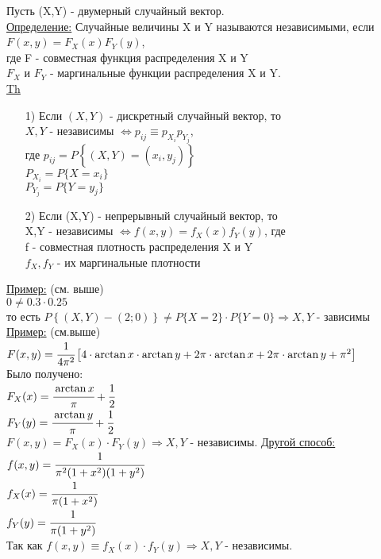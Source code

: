 

Пусть (X,Y) - двумерный случайный вектор.\\
\underline{Определение:} Случайные величины X и Y называются независимыми, если\\
$F(x,y) = F_X(x) F_Y(y)$,\\
где F - совместная функция распределения X и Y\\
$F_X$ и $F_Y$ - маргинальные функции распределения X и Y.\\


\underline{Th}
\begin{enumerate}
	\item[1)] Если $(X,Y)$ - дискретный случайный вектор, то\\
	$X,Y$ - независимы $\Leftrightarrow p_{ij} \equiv p_{X_i} p_{Y_j}$,\\
	где $p_{ij} = P\left\{(X,Y) = (x_i, y_j)\right\}$\\
	$P_{X_i} = P\{X = x_i\}$\\
	$P_{Y_j} = P\{Y = y_j\}$\\
	
	\item[2)] Если (X,Y) - непрерывный случайный вектор, то\\
	X,Y - независимы $\Leftrightarrow f(x,y) = f_X(x) f_Y(y)$, где\\
	f - совместная плотность распределения X и Y\\
	$f_X, f_Y$ - их маргинальные плотности\\
\end{enumerate}


\underline{Пример:} (см. выше)\\
$0 \neq 0.3 \cdot 0.25$\\
то есть $P\left\{(X,Y) - (2;0)\right\} \neq P\{X = 2\} \cdot P\{Y = 0\} \Rightarrow X,Y$ - зависимы\\


\underline{Пример:} (см.выше)\\
$F(x,y) = \cfrac{1}{4 \pi^2} \left[ 4 \cdot \arctan{x} \cdot \arctan{y} + 2\pi \cdot \arctan{x} + 2\pi \cdot \arctan{y} + \pi^2 \right]$\\
Было получено:\\
$F_X(x) = \cfrac{\arctan{x}}{\pi} + \cfrac{1}{2}$\\
$F_Y(y) = \cfrac{\arctan{y}}{\pi} + \cfrac{1}{2}$\\
$F(x,y) = F_X(x) \cdot F_Y(y) \Rightarrow X,Y$ - независимы.
\underline{Другой способ:}\\
$f(x,y) = \cfrac{1}{\pi^2 (1 + x^2)(1 + y^2)}$\\
$f_X(x) = \cfrac{1}{\pi (1 + x^2)}$\\
$f_Y(y) = \cfrac{1}{\pi (1 + y^2)}$\\
Так как $f(x,y) \equiv f_X(x) \cdot f_Y(y) \Rightarrow X,Y$ - независимы.\\


